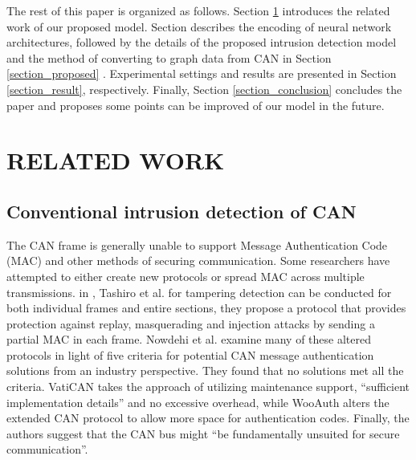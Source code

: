 \documentclass[lettersize,journal]{IEEEtran}
\begin{document}
The rest of this paper is organized as follows. Section \ref{section_related_work}  introduces the related work of our proposed model. Section \label{section_architecture_search_space} describes the encoding of neural network architectures, followed by the details of the proposed intrusion detection model and the method of converting to graph data from CAN in Section \ref{section_proposed} . Experimental settings and results are presented in Section \ref{section_result}, respectively. Finally, Section \ref{section_conclusion} concludes the paper and proposes some points can be improved of our model in the future.

\section{RELATED WORK}\label{section_related_work}
\subsection{Conventional intrusion detection of CAN}
The CAN frame is generally unable to support Message  Authentication Code (MAC) \cite{44} and other methods of securing communication. Some researchers have attempted to either create new protocols or spread MAC across multiple transmissions. in \cite{45}, Tashiro et al. for tampering detection can be conducted for both individual frames and entire sections, they propose a protocol that provides protection against replay, masquerading and injection attacks by sending a partial MAC in each frame. Nowdehi et al. \cite{46} examine many of these altered protocols in light of five criteria for potential CAN message authentication solutions from an industry perspective. They found that no solutions met all the criteria. VatiCAN takes the approach of utilizing maintenance support, “sufficient implementation details” and no excessive overhead, while WooAuth alters the extended CAN protocol to allow more space for authentication codes. Finally, the authors suggest that the CAN bus might “be fundamentally unsuited for secure communication”. \cite{46}
\end{document}
